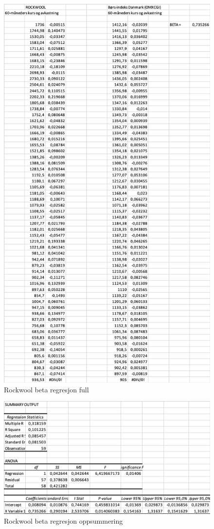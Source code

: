 \begin{figure}[H]
\centering
\includegraphics [scale=0.65]{appendiks/bilder/rockwoolbetaregfull.png}
\caption{Rockwool beta regresjon full}
\label{fig:rockwoolbetaregfull}
\end{figure}

\begin{figure}[H]
\centering
\includegraphics [scale=0.9]{appendiks/bilder/rockwoolbetaregsummary.png}
\caption{Rockwool beta regresjon oppsummering}
\label{fig:rockwoolbetaregsummary}
\end{figure}